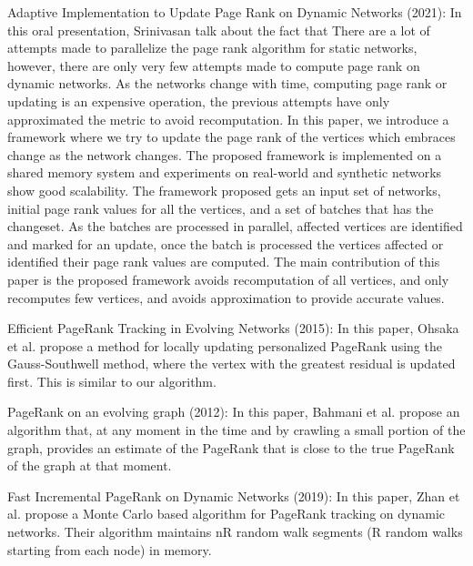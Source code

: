 Adaptive Implementation to Update Page Rank on Dynamic Networks (2021): In this oral presentation, Srinivasan \cite{srinivasan2021adaptive} talk about the fact that There are a lot of attempts made to parallelize the page rank algorithm for static networks, however, there are only very few attempts made to compute page rank on dynamic networks. As the networks change with time, computing page rank or updating is an expensive operation, the previous attempts have only approximated the metric to avoid recomputation. In this paper, we introduce a framework where we try to update the page rank of the vertices which embraces change as the network changes. The proposed framework is implemented on a shared memory system and experiments on real-world and synthetic networks show good scalability. The framework proposed gets an input set of networks, initial page rank values for all the vertices, and a set of batches that has the changeset. As the batches are processed in parallel, affected vertices are identified and marked for an update, once the batch is processed the vertices affected or identified their page rank values are computed. The main contribution of this paper is the proposed framework avoids recomputation of all vertices, and only recomputes few vertices, and avoids approximation to provide accurate values.


Efficient PageRank Tracking in Evolving Networks (2015): In this paper, Ohsaka et al. \cite{ohsaka2015efficient} propose a method for locally updating personalized PageRank using the Gauss-Southwell method, where the vertex with the greatest residual is updated first. This is similar to our algorithm.

PageRank on an evolving graph (2012): In this paper, Bahmani et al. \cite{bahmani2012pagerank} propose an algorithm that, at any moment in the time and by crawling a small portion of the graph, provides an estimate of the PageRank that is close to the true PageRank of the graph at that moment.

Fast Incremental PageRank on Dynamic Networks (2019): In this paper, Zhan et al. \cite{zhan2019fast} propose a Monte Carlo based algorithm for PageRank tracking on dynamic networks. Their algorithm maintains nR random walk segments (R random walks starting from each node) in memory.

